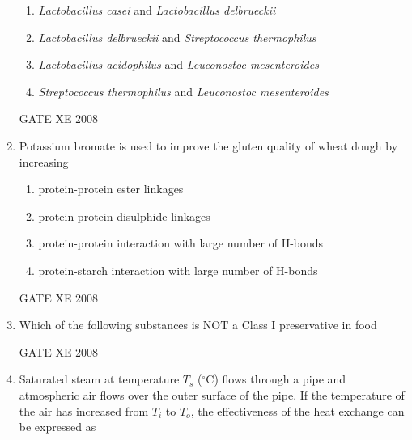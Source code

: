 \documentclass[12pt]{article}
\begin{document}
\begin{enumerate}[label=Q\arabic*.]
\begin{enumerate}[label=(\Alph*)]
    \item  \textit{Lactobacillus casei} and \textit{Lactobacillus delbrueckii} 
    \item  \textit{Lactobacillus delbrueckii} and \textit{Streptococcus thermophilus} 
    \item  \textit{Lactobacillus acidophilus} and \textit{Leuconostoc mesenteroides} 
    \item  \textit{Streptococcus thermophilus} and \textit{Leuconostoc mesenteroides} 
\end{enumerate}
    
    GATE XE 2008

    \item Potassium bromate is used to improve the gluten quality of wheat dough by increasing 

\begin{enumerate}[label=(\Alph*)]
\item  protein-protein ester linkages 
\item  protein-protein disulphide linkages 
\item  protein-protein interaction with large number of H-bonds 
\item  protein-starch interaction with large number of H-bonds 
\end{enumerate}
    
    GATE XE 2008

    \item Which of the following substances is NOT a Class I preservative in food 

\begin{enumerate}[label=(\Alph*)]
\end{enumerate}
    
    GATE XE 2008

    \item Saturated steam at temperature $T_s$ ($^\circ$C) flows through a pipe and atmospheric air flows over the outer surface of the pipe. If the temperature of the air has increased from $T_i$ to $T_o$, the effectiveness of the heat exchange can be expressed as 


\end{enumerate}
\end{document}
